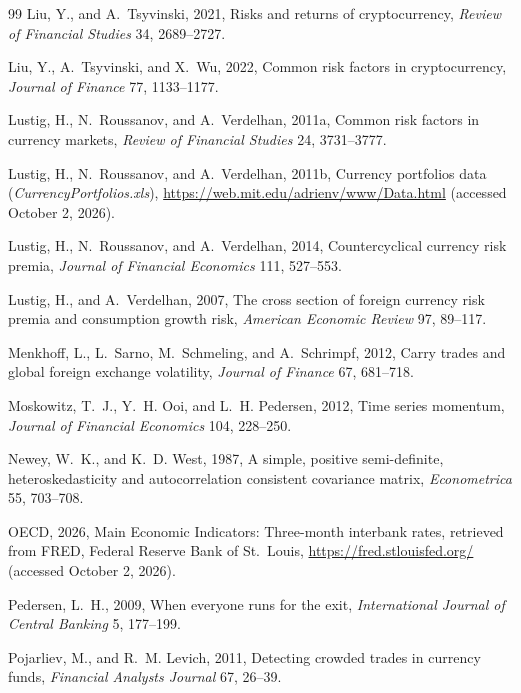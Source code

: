 \documentclass[11pt]{article}
\begin{document}
\begin{thebibliography}{99}
Liu, Y., and A.~Tsyvinski, 2021, Risks and returns of cryptocurrency, \textit{Review of Financial Studies} 34, 2689--2727.

Liu, Y., A.~Tsyvinski, and X.~Wu, 2022, Common risk factors in cryptocurrency, \textit{Journal of Finance} 77, 1133--1177.

Lustig, H., N.~Roussanov, and A.~Verdelhan, 2011a, Common risk factors in currency markets, \textit{Review of Financial Studies} 24, 3731--3777.

Lustig, H., N.~Roussanov, and A.~Verdelhan, 2011b, Currency portfolios data (\textit{CurrencyPortfolios.xls}), \url{https://web.mit.edu/adrienv/www/Data.html} (accessed October 2, 2026).

Lustig, H., N.~Roussanov, and A.~Verdelhan, 2014, Countercyclical currency risk premia, \textit{Journal of Financial Economics} 111, 527--553.

Lustig, H., and A.~Verdelhan, 2007, The cross section of foreign currency risk premia and consumption growth risk, \textit{American Economic Review} 97, 89--117.

Menkhoff, L., L.~Sarno, M.~Schmeling, and A.~Schrimpf, 2012, Carry trades and global foreign exchange volatility, \textit{Journal of Finance} 67, 681--718.

Moskowitz, T.~J., Y.~H. Ooi, and L.~H. Pedersen, 2012, Time series momentum, \textit{Journal of Financial Economics} 104, 228--250.

Newey, W.~K., and K.~D. West, 1987, A simple, positive semi-definite, heteroskedasticity and autocorrelation consistent covariance matrix, \textit{Econometrica} 55, 703--708.

OECD, 2026, Main Economic Indicators: Three-month interbank rates, retrieved from FRED, Federal Reserve Bank of St.~Louis, \url{https://fred.stlouisfed.org/} (accessed October 2, 2026).

Pedersen, L.~H., 2009, When everyone runs for the exit, \textit{International Journal of Central Banking} 5, 177--199.

Pojarliev, M., and R.~M. Levich, 2011, Detecting crowded trades in currency funds, \textit{Financial Analysts Journal} 67, 26--39.


\end{thebibliography}
\end{document}
